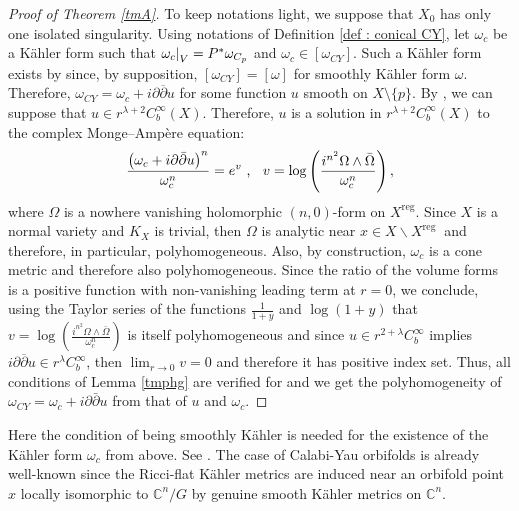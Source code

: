 \documentclass[a4paper,11pt]{article}
\def\C{\mathbb{C}}
\newcommand\restr[2]{{%
  \left.\kern-\nulldelimiterspace %
  #1 %
  \littletaller %
  \right|_{#2} %
  }}
\newcommand{\littletaller}{\mathchoice{\vphantom{\big|}}{}{}{}}
\begin{document}
 \begin{proof}[Proof of Theorem \ref{tmA}]
To keep notations light, we suppose that $X_0$ has only one isolated singularity. Using notations of Definition \ref{def : conical CY}, let $\omega_c$ be a Kähler form such that $\restr{\omega_c}{V} = P^{*} \omega_{C_p}$ and $\omega_c \in [\omega_{CY}]$. Such a Kähler form exists by \cite[Proposition 2.4.]{arezzo2016csck} since, by supposition, $[\omega_{CY}]=[\omega]$ for smoothly Kähler form $\omega$. Therefore, $\omega_{CY} = \omega_c + i \partial \overline{\partial} u$ for some function $u$ smooth on $X \setminus \{ p\}$. By \cite[Lemma A.1]{hein_calabi-yau_2017}, we can suppose that $u \in r^{\lambda + 2} C_{b}^{\infty}(X)$. Therefore, $u$ is a solution in $ r^{\lambda + 2} C_{b}^{\infty}(X)$ to the complex Monge–Ampère equation:  
$$
\frac{\left(\omega_{c}+i \partial \bar{\partial} u\right)^n}{\omega_{c}^n}=e^v \text{ , }\hspace{0.1cm} \hspace{0.1cm}  v = \log \left(\frac{ i^{n^2} \Omega \wedge \bar \Omega}{\omega_{c}^{n}}\right),
$$
where $\Omega$ is a nowhere vanishing holomorphic $(n,0)$-form on $X^{\text{reg}}$. Since $X$ is a normal variety and $K_X$ is trivial, then $\Omega$ is analytic near $x \in  X \backslash X^{\text {reg }}$ and therefore, in particular, polyhomogeneous. Also, by construction, $\omega_{c}$ is a cone metric and therefore also  polyhomogeneous. Since the ratio of the volume forms is a positive function with non-vanishing leading term at $r=0$, we conclude, using the Taylor series of the functions $\frac{1}{1+y}$ and $\log(1+y)$ that $v= \log \left(\frac{i^{n^2} \Omega \wedge \bar \Omega}{\omega_{c}^{n}}\right)$ is itself polyhomogeneous and since $u \in r^{2+ \lambda} C_b^\infty$ implies $i \partial \overline{\partial} u \in r^{\lambda} C_b^\infty$, then $\lim_{r \rightarrow 0} v =0$ and therefore it has positive index set. Thus, all conditions of Lemma \ref{tmphg} are verified for and we get the polyhomogeneity of $\omega_{CY} = \omega_{c} + i \partial \bar \partial u $ from that of  $u$ and $\omega_{c}$.   
 \end{proof}
Here the condition of being smoothly Kähler is needed for the existence of the Kähler form $\omega_c$ from above. See \cite[Proposition 2.4]{arezzo2016csck}. The case of Calabi-Yau orbifolds is already well-known since the Ricci-flat Kähler metrics are induced near an orbifold point $x$ locally isomorphic to $\C^n/G$  by genuine smooth Kähler metrics on $\C^n$.\\
 
\end{document}
